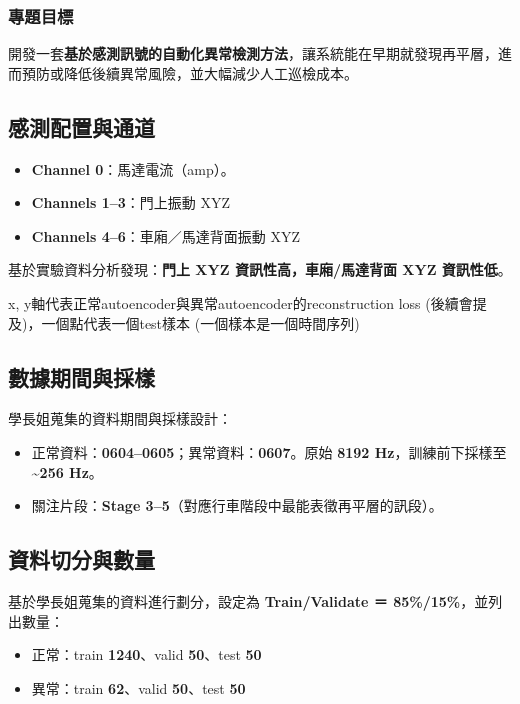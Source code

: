 \documentclass[12pt,a4paper]{article}
\begin{document}
\subsubsection{專題目標}
開發一套\textbf{基於感測訊號的自動化異常檢測方法}，讓系統能在早期就發現再平層，進而預防或降低後續異常風險，並大幅減少人工巡檢成本。

\subsection{感測配置與通道}

\begin{itemize}
    \item \textbf{Channel 0}：馬達電流（amp）。
    \item \textbf{Channels 1–3}：門上振動 XYZ
    \item \textbf{Channels 4–6}：車廂／馬達背面振動 XYZ
\end{itemize}

基於實驗資料分析發現：\textbf{門上 XYZ 資訊性高，車廂/馬達背面 XYZ 資訊性低}。

x, y軸代表正常autoencoder與異常autoencoder的reconstruction loss (後續會提及)，一個點代表一個test樣本 (一個樣本是一個時間序列)

\subsection{數據期間與採樣}

學長姐蒐集的資料期間與採樣設計：

\begin{itemize}
    \item 正常資料：\textbf{0604–0605}；異常資料：\textbf{0607}。原始 \textbf{8192 Hz}，訓練前下採樣至 \textbf{\textasciitilde 256 Hz}。
    \item 關注片段：\textbf{Stage 3–5}（對應行車階段中最能表徵再平層的訊段）。
\end{itemize}

\subsection{資料切分與數量}

基於學長姐蒐集的資料進行劃分，設定為 \textbf{Train/Validate ＝ 85\%/15\%}，並列出數量：

\begin{itemize}
    \item 正常：train \textbf{1240}、valid \textbf{50}、test \textbf{50}
    \item 異常：train \textbf{62}、valid \textbf{50}、test \textbf{50}
\end{itemize}
\end{document}
